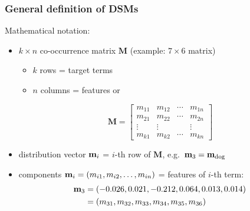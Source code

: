 \documentclass[t]{beamer} %
\begin{document}
\begin{frame}
  \frametitle{General definition of DSMs}

  Mathematical notation:
  \begin{itemize}
  \item $k \times n$ co-occurrence matrix $\mathbf{M}$ (example: $7\times 6$ matrix)
    \begin{itemize}
    \item $k$ rows = target terms
    \item $n$ columns = features or 
    \end{itemize}
    \begin{small}
      \gap[.5]
      \[
      \mathbf{M} =
      \begin{bmatrix}
        m_{11} & m_{12} & \cdots & m_{1n} \\
        m_{21} & m_{22} & \cdots & m_{2n} \\
        \vdots & \vdots & & \vdots \\
        m_{k1} & m_{k2} & \cdots & m_{kn}
      \end{bmatrix}
      \]
    \end{small}
  \item distribution vector $\Vector{m}_i$ = $i$-th row of $\mathbf{M}$, e.g.\ $\Vector{m}_3 = \Vector{m}_{\text{dog}}$
  \item components $\Vector{m}_i = (m_{i1}, m_{i2}, \ldots, m_{in})$ = features of $i$-th term:
    \begin{align*}
      \Vector{m}_3 &= (-0.026, 0.021, -0.212, 0.064, 0.013, 0.014) \\
      &= (m_{31}, m_{32}, m_{33}, m_{34}, m_{35}, m_{36})
    \end{align*}
  \end{itemize}

\end{frame}
\end{document}
